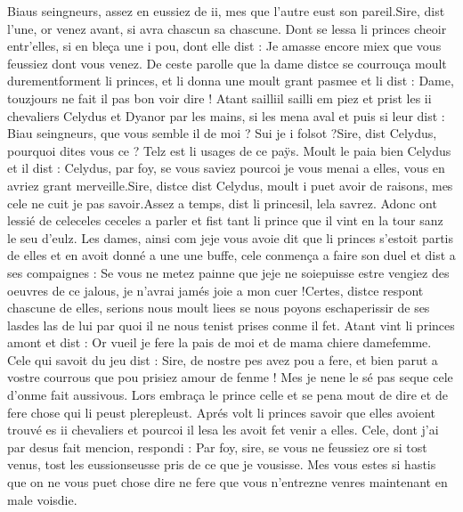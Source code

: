 \documentclass{article}
\begin{document}
\begin{pages}
   Biaus seingneurs, assez en eussiez de ii, mes que l’autre eust son pareil.Sire, dist l’une, or venez avant, si avra chascun sa chascune.
   Dont se lessa li princes cheoir entr’elles, si en bleça une i pou, dont elle dist :
   Je amasse encore miex que vous feussiez dont vous venez.
   De ceste parolle que la dame distce se courrouça moult 
   durementforment li princes, 
   et li donna une moult grant pasmee et li dist :
   Dame, touzjours ne fait il pas bon voir dire !
   Atant sailliil sailli em piez et prist les 
   ii chevaliers 
   Celydus et Dyanor 
   par les mains, si les mena aval et puis si leur dist :
   Biau seingneurs, que vous semble il de moi ? 
      Sui je i 
      folsot ?Sire, dist Celydus, pourquoi dites 
      vous ce ? 
      Telz est li usages de ce paÿs.
   Moult le paia bien Celydus et il dist :
   Celydus, par foy, se vous saviez pourcoi je vous menai a elles, 
   vous en avriez grant merveille.Sire, distce dist 
      Celydus, moult i puet avoir de raisons, mes cele ne cuit je pas savoir.Assez a temps, dist 
      li princesil, 
      lela savrez.
   Adonc ont lessié de 
   celeceles
      ceceles 
   a parler et fist tant li prince 
   que il vint en la tour sanz le seu d’eulz. \pend 
\pstart Les dames, ainsi com jeje vous 
   avoie dit que li princes
   s’estoit partis de elles et en avoit donné a une une buffe, cele conmença a faire son duel et dist a ses compaignes :
   Se vous ne metez painne que jeje ne 
      soiepuisse estre 
      vengiez des oeuvres de ce jalous, 
      je n’avrai jamés joie a mon cuer !Certes, distce respont chascune 
      de elles, serions nous moult liees se nous poyons 
      eschaperissir 
      de ses lasdes las de lui 
   par quoi il ne nous tenist prises conme il fet.
   Atant vint li princes amont et dist :
   Or vueil je fere la pais de moi et de 
      mama chiere damefemme.
   Cele qui savoit du jeu dist :
   Sire, de nostre pes avez pou a fere, et bien parut a vostre courrous que pou prisiez amour de fenme ! 
      Mes je nene le sé pas 
      seque cele d’onme fait 
      aussivous.
   Lors embraça le prince celle et se pena mout de dire et de fere chose qui li 
   peust plerepleust. Aprés volt 
   li princes savoir que elles avoient trouvé es 
   ii chevaliers 
   et pourcoi il lesa les 
   avoit fet venir a elles. Cele, dont j’ai par desus fait mencion, respondi :
   Par foy, sire, se vous ne feussiez ore si tost venus, tost les 
     eussionseusse pris de ce que je vousisse. 
   Mes vous estes si hastis que on ne vous puet chose dire ne fere que vous 
     n’entrezne venres maintenant en male voisdie.

\end{pages}
\end{document}

